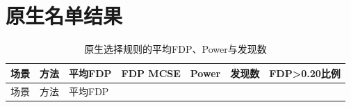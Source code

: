 \documentclass{sufethesismas}
\begin{document}
\section{原生名单结果}

{
\footnotesize
\begin{longtable}[]{@{}
  >{\raggedright\arraybackslash}p{}
  >{\raggedright\arraybackslash}p{}
  >{\raggedright\arraybackslash}p{}
  >{\raggedright\arraybackslash}p{}
  >{\raggedright\arraybackslash}p{}
  >{\raggedright\arraybackslash}p{}
  >{\raggedright\arraybackslash}p{}@{}}
\caption{原生选择规则的平均FDP、Power与发现数}\tabularnewline
\toprule\noalign{}
\begin{minipage}[b]{\linewidth}\raggedright
场景
\end{minipage} & \begin{minipage}[b]{\linewidth}\raggedright
方法
\end{minipage} & \begin{minipage}[b]{\linewidth}\raggedright
平均FDP
\end{minipage} & \begin{minipage}[b]{\linewidth}\raggedright
FDP MCSE
\end{minipage} & \begin{minipage}[b]{\linewidth}\raggedright
Power
\end{minipage} & \begin{minipage}[b]{\linewidth}\raggedright
发现数
\end{minipage} & \begin{minipage}[b]{\linewidth}\raggedright
FDP\textgreater0.20比例
\end{minipage} \\
\midrule\noalign{}
\endfirsthead
\toprule\noalign{}
\begin{minipage}[b]{\linewidth}\raggedright
场景
\end{minipage} & \begin{minipage}[b]{\linewidth}\raggedright
方法
\end{minipage} & \begin{minipage}[b]{\linewidth}\raggedright
平均FDP
\end{minipage} & \begin{minipage}[b]{\linewidth}\raggedright

\end{minipage}
\end{longtable}}
\end{document}
